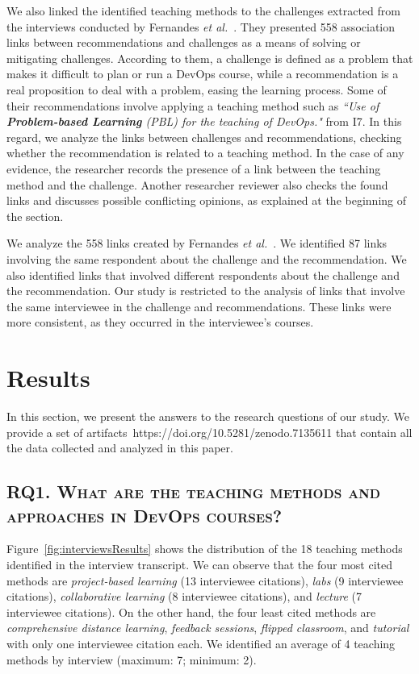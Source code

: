 \documentclass[10pt,conference]{IEEEtran}
\begin{document}
We also linked the identified teaching methods to the challenges extracted from the interviews conducted by Fernandes \textit{et al.}~\cite{fernandes:2022}. They presented 558 association links between recommendations and challenges as a means of solving or mitigating challenges. According to them, a challenge is defined as a problem that makes it difficult to plan or run a DevOps course, while a recommendation is a real proposition to deal with a problem, easing the learning process. Some of their recommendations involve applying a teaching method such as \textit{``Use of \textbf{Problem-based Learning} (PBL) for the teaching of DevOps."} from I7. In this regard, we analyze the links between challenges and recommendations,  checking whether the recommendation is related to a teaching method.  In the case of any evidence, the researcher records the presence of a link between the teaching method and the challenge. Another researcher reviewer also checks the found links and discusses possible conflicting opinions, as explained at the beginning of the section.


We analyze the 558 links created by Fernandes \textit{et al.}~\cite{fernandes:2022}. We identified 87 links involving the same respondent about the challenge and the recommendation. We also identified links that involved different respondents about the challenge and the recommendation. Our study is restricted to the analysis of links that involve the same interviewee in the challenge and recommendations. These links were more consistent, as they occurred in the interviewee’s courses.



\section{Results}  \label{sec:results}

In this section, we present the answers to the research questions of our study.  We provide a set of artifacts~https://doi.org/10.5281/zenodo.7135611 that contain all the data collected and analyzed in this paper.


\subsection{RQ1. \textsc{What are the teaching methods and approaches in DevOps courses?}}


Figure~\ref{fig:interviewsResults} shows the distribution of the 18 teaching methods identified in the interview transcript. We can observe that the four most cited methods are \textsl{project-based learning} (13 interviewee citations), \textsl{labs} (9 interviewee citations), \textsl{collaborative learning} (8 interviewee citations), and \textsl{lecture} (7 interviewee citations). On the other hand, the four least cited methods are \textsl{comprehensive distance learning}, \textsl{feedback sessions}, \textsl{flipped classroom}, and \textsl{tutorial} with only one interviewee citation each. We identified an average of 4 teaching methods by interview (maximum: 7; minimum: 2).
 
\end{document}
